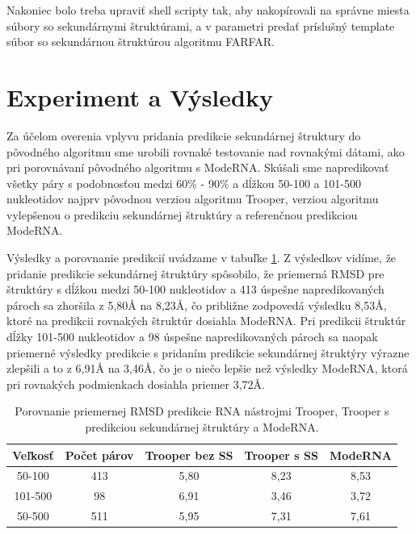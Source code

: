 \indent Nakoniec bolo treba upraviť shell scripty tak, aby nakopírovali na správne miesta súbory so sekundárnymi štruktúrami, a v parametri predať príslušný template súbor so sekundárnou štruktúrou algoritmu FARFAR.

\section{Experiment a Výsledky}
Za účelom overenia vplyvu pridania predikcie sekundárnej štruktury do pôvodného algoritmu sme urobili rovnaké testovanie nad rovnakými dátami, ako pri porovnávaní pôvodného algoritmu s ModeRNA. Skúšali sme napredikovať všetky páry s podobnosťou medzi 60\% - 90\% a dĺžkou 50-100 a 101-500 nukleotidov najprv pôvodnou verziou algoritmu Trooper, verziou algoritmu vylepšenou o predikciu sekundárnej štruktúry a referenčnou predikciou ModeRNA. 


\indent  Výsledky a porovnanie predikcií uvádzame v tabuľke \ref{tab5.1}. Z výsledkov vidíme, že pridanie predikcie sekundárnej štruktúry spôsobilo, že priemerná RMSD pre štruktúry s dĺžkou medzi 50-100 nukleotidov a 413 úspešne napredikovaných pároch sa zhoršila z 5,80Å na 8,23Å, čo približne zodpovedá výsledku 8,53Å, ktoré na predikcii rovnakých štruktúr dosiahla ModeRNA. Pri predikcii štruktúr dĺžky 101-500 nukleotidov a 98 úspešne napredikovaných pároch sa naopak priemerné výsledky predikcie s pridaním predikcie sekundárnej štruktýry výrazne zlepšili a to z 6,91Å na 3,46Å, čo je o niečo lepšie než výsledky ModeRNA, ktorá pri rovnakých podmienkach dosiahla priemer 3,72Å. 
\begin{table}[b!]
\centering
\begin{tabular}{ccccc}
\toprule
Veľkosť & Počet párov & Trooper bez SS & Trooper s SS & ModeRNA\\
\midrule
50-100  & 413 & 5,80  & 8,23 & 8,53\\
101-500  & 98 & 6,91  & 3,46 & 3,72\\
\bottomrule
50-500  &  511 & 5,95  & 7,31 & 7,61\\
\end{tabular}
\caption{Porovnanie priemernej RMSD predikcie RNA nástrojmi Trooper, Trooper s predikciou sekundárnej štruktúry a ModeRNA. }\label{tab5.1}
\end{table}


